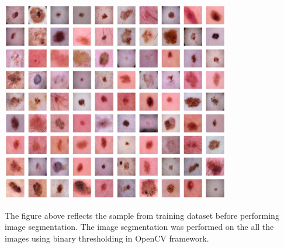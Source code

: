 \begin{center}
	\includegraphics[width=10cm]{Images/bseg.png}
\end{center}

The figure above reflects the sample from training dataset before performing image segmentation.
The image segmentation was performed on the all the images using binary thresholding in OpenCV framework.

